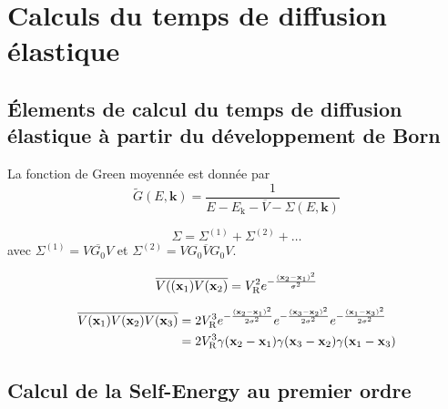 \chapter{Calculs du temps de diffusion élastique}
\label{ch:anex_taus}

\section{Élements de calcul du temps de diffusion élastique à partir du développement de Born}
La fonction de Green moyennée est donnée par 
\begin{equation}
\widetilde{G}(E,\mathbf{k})=\frac{1}{E-E_{\mathrm{k}}-\overline{V}-\Sigma(E,\mathbf{k})}
\end{equation}


\begin{equation}
\Sigma=\Sigma^{(1)} + \Sigma^{(2)} + \dots
\end{equation}
avec $\Sigma^{(1)}=\overline{V G_0 V}$ et $\Sigma^{(2)}=\overline{V G_0 V G_0 V}$.

\begin{equation}
\overline{V((\mathbf{x}_{\mathrm{1}})V(\mathbf{x}_{\mathrm{2}})}=V_{\mathrm{R}}^2 e^{-\frac{(\mathbf{x}_{\mathrm{2}}-\mathbf{x}_{\mathrm{1}})^2}{\sigma^2}}
\end{equation}

\begin{align}
\overline{V(\mathbf{x}_{\mathrm{1}})V(\mathbf{x}_{\mathrm{2}})V(\mathbf{x}_{\mathrm{3}})}&= 2V_{\mathrm{R}}^3 e^{-\frac{(\mathbf{x}_{\mathrm{2}}-\mathbf{x}_{\mathrm{1}})^2}{2\sigma^2}}e^{-\frac{(\mathbf{x}_{\mathrm{3}}-\mathbf{x}_{\mathrm{2}})^2}{2\sigma^2}}e^{-\frac{(\mathbf{x}_{\mathrm{1}}-\mathbf{x}_{\mathrm{3}})^2}{2\sigma^2}} \\ 
&=2V_{\mathrm{R}}^3 \gamma(\mathbf{x}_{\mathrm{2}}-\mathbf{x}_{\mathrm{1}})\gamma(\mathbf{x}_{\mathrm{3}}-\mathbf{x}_{\mathrm{2}})\gamma(\mathbf{x}_{\mathrm{1}}-\mathbf{x}_{\mathrm{3}})
\end{align}


\section{Calcul de la Self-Energy au premier ordre}

